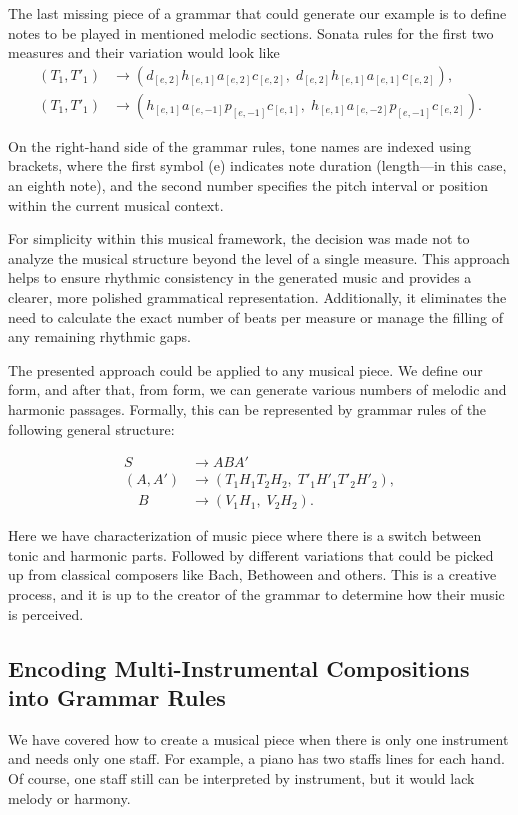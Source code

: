 The last missing piece of a grammar that could generate our example is to define notes to be played in mentioned melodic sections. Sonata rules for the first two measures and their variation would look like 
\begin{align*}
(T_1, T'_1) &\rightarrow (d_{[e,2]} h_{[e,1]} a_{[e,2]} c_{[e,2]},\; d_{[e,2]}h_{[e,1]}a_{[e,1]} c_{[e,2]}), \\[6pt]
(T_1, T'_1) &\rightarrow (h_{[e,1]}a_{[e,-1]}p_{[e,-1]}c_{[e,1]},\; h_{[e,1]}a_{[e,-2]}p_{[e,-1]}c_{[e,2]}).
\end{align*}

On the right-hand side of the grammar rules, tone names are indexed using brackets, where the first symbol (e) indicates note duration (length—in this case, an eighth note), and the second number specifies the pitch interval or position within the current musical context.

For simplicity within this musical framework, the decision was made not to analyze the musical structure beyond the level of a single measure. This approach helps to ensure rhythmic consistency in the generated music and provides a clearer, more polished grammatical representation. Additionally, it eliminates the need to calculate the exact number of beats per measure or manage the filling of any remaining rhythmic gaps.

The presented approach could be applied to any musical piece. We define our form, and after that, from form, we can generate various numbers of melodic and harmonic passages. Formally, this can be represented by grammar rules of the following general structure:

\begin{align*}
S &\rightarrow ABA' \\
(A,A') &\rightarrow (T_1H_1T_2H_2,\; T'_1H'_1T'_2H'_2), \\
\quad B &\rightarrow (V_1H_1,\; V_2H_2).
\end{align*}

Here we have characterization of music piece where there is a switch between tonic and harmonic parts. Followed by different variations that could be picked up from classical composers like Bach, Bethoween and others. This is a creative process, and it is up to the creator of the grammar to determine how their music is perceived.

\subsection*{Encoding Multi-Instrumental Compositions into Grammar Rules}
We have covered how to create a musical piece when there is only one instrument and needs only one staff. For example, a piano has two staffs lines for each hand. Of course, one staff still can be interpreted by instrument, but it would lack melody or harmony.

